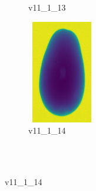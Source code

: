 \documentclass[11pt]{article}
\begin{document}
\begin{figure}
\begin{subfigure}[b]{0.15\textwidth}
        \caption{v11\_1\_13}
         \label{fig:five over x}
     \end{subfigure}
     \hfill
    \begin{subfigure}[b]{0.15\textwidth}
         \centering
         \includegraphics[width=3cm, height=4.5cm]{images/kartofler/v11_1_14_cut.png}
        \caption{v11\_1\_14}
         \label{fig:five over x}
     \end{subfigure}
     
     
     \\ \\
     

\end{figure}
\end{document}
